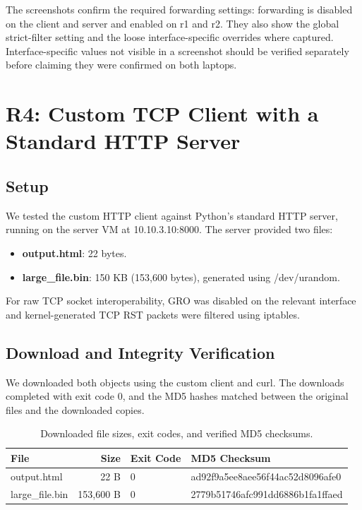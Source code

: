 \documentclass[12pt]{article}
\begin{document}
The screenshots confirm the required forwarding settings: forwarding is disabled on the client and server and enabled on r1 and r2. They also show the global strict-filter setting and the loose interface-specific overrides where captured. Interface-specific values not visible in a screenshot should be verified separately before claiming they were confirmed on both laptops.

\newpage


\section{R4: Custom TCP Client with a Standard HTTP Server}
\label{sec:r4}

\subsection{Setup}

We tested the custom HTTP client against Python's standard HTTP server, running on the server VM at 10.10.3.10:8000. The server provided two files:

\begin{itemize}
    \item \textbf{output.html}: 22 bytes.
    \item \textbf{large\_file.bin}: 150 KB (153,600 bytes), generated using {/dev/urandom}.
\end{itemize}

For raw TCP socket interoperability, GRO was disabled on the relevant interface and kernel-generated TCP RST packets were filtered using iptables.

\subsection{Download and Integrity Verification}

We downloaded both objects using the custom client and {curl}. The downloads completed with exit code 0, and the MD5 hashes matched between the original files and the downloaded copies.

\begin{table}[H]
    \centering
    \renewcommand{\arraystretch}{1.2}
    \begin{tabularx}{\textwidth}{@{} l r l X @{}}
        \toprule
        \textbf{File} & \textbf{Size} & \textbf{Exit Code} &
        \textbf{MD5 Checksum} \\
        \midrule
        output.html & 22 B & 0 &
        {ad92f9a5ee8aee56f44ac52d8096afe0} \\
        large\_file.bin & 153,600 B & 0 &
        {2779b51746afc991dd6886b1fa1ffaed} \\
        \bottomrule
    \end{tabularx}
    \caption{Downloaded file sizes, exit codes, and verified MD5 checksums.}
    \label{tab:r4_md5_table}
\end{table}
\end{document}
